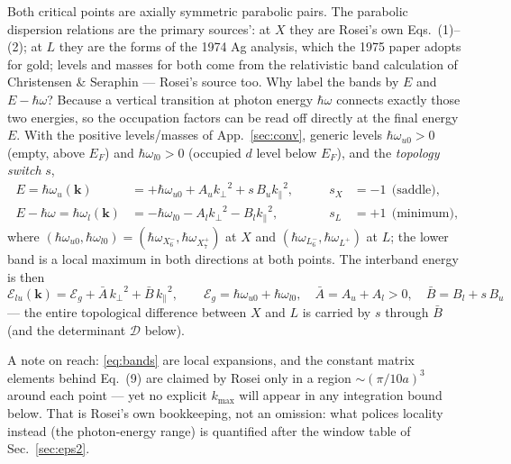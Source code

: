 \documentclass[11pt,a4paper]{article}
\numberwithin{equation}{section}
\begin{document}
Both critical points are axially symmetric parabolic pairs.  The
parabolic dispersion relations are the primary sources': at $X$ they
are Rosei's own Eqs.~(1)--(2); at $L$ they are the forms of the 1974
Ag analysis, which the 1975 paper adopts for gold; levels and masses
for both come from the relativistic band calculation of Christensen \&
Seraphin --- Rosei's source too.  Why label the bands by $E$ and
$E-{\hbar\omega}$?  Because a vertical transition at photon energy ${\hbar\omega}$
connects exactly those two energies, so the occupation factors can be
read off directly at the final energy $E$.  With the positive
levels/masses of App.~\ref{sec:conv}, generic levels ${\hbar\omega_{u0}}>0$ (empty,
above $E_F$) and ${\hbar\omega_{l0}}>0$ (occupied $d$ level below $E_F$), and the
\emph{topology switch} $s$,
\begin{equation}
\boxed{\;
\begin{aligned}
E=\hbar\omega_u(\mathbf k)&=+{\hbar\omega_{u0}}+A_u{k_{\perp}}^{2}+s\,B_u{k_{\parallel}}^{2},
&\qquad s_{X}&=-1\ \ \text{(saddle)},\\[2pt]
E-{\hbar\omega}=\hbar\omega_l(\mathbf k)&=-{\hbar\omega_{l0}}-A_l{k_{\perp}}^{2}-B_l{k_{\parallel}}^{2},
&\qquad s_{L}&=+1\ \ \text{(minimum)},
\end{aligned}\;}
\label{eq:bands}
\end{equation}
where $({\hbar\omega_{u0}},{\hbar\omega_{l0}})=({\hbar\omega_{X_6^-}},{\hbar\omega_{X_7^+}})$ at $X$ and $({\hbar\omega_{L_6^-}},{\hbar\omega_{L^+}})$ at $L$; the
lower band is a local maximum in both directions at both points.  The
interband energy is then
\begin{equation}
{\mathcal{E}_{lu}}(\mathbf k)
={\mathcal{E}_g}+{\bar{A}}\,{k_{\perp}}^{2}+{\bar{B}}\,{k_{\parallel}}^{2},
\qquad
{\mathcal{E}_g}={\hbar\omega_{u0}}+{\hbar\omega_{l0}},\quad
{\bar{A}}=A_u+A_l>0,\quad
\boxed{{\bar{B}}=B_l+s\,B_u}
\label{eq:Omega}
\end{equation}
--- the entire topological difference between $X$ and $L$ is carried
by $s$ through ${\bar{B}}$ (and the determinant ${\mathcal{D}}$ below).

A note on reach: \eqref{eq:bands} are local expansions, and the
constant matrix elements behind Eq.~(9) are claimed by Rosei only in a
region ${\sim}(\pi/10a)^{3}$ around each point --- yet no explicit
$k_{\max}$ will appear in any integration bound below.  That is
Rosei's own bookkeeping, not an omission: what polices locality
instead (the photon-energy range) is quantified after the window table
of Sec.~\ref{sec:eps2}.
\end{document}
